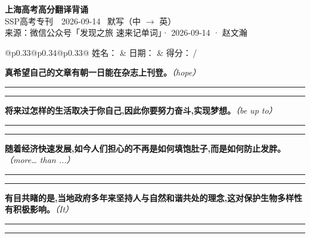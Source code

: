 \documentclass[11pt,a4paper]{article}
\newcommand{\num}[1]{\makebox[1.9em][r]{#1.}\hspace{0.3em}}
\newcommand{\wline}{\noindent\rule{\linewidth}{0.4pt}}
\newcommand{\prompt}[1]{\emph{\textcolor{tipblue}{\small（#1）}}}
\begin{document}
\pagestyle{plain}
\begin{center}
{\LARGE\bfseries 上海高考高分翻译背诵 }\\[0.25em]
{\large SSP高考专刊　2026-09-14 \quad\ 默写（中 $\to$ 英）}\\[0.35em]
{\footnotesize 来源：微信公众号「发现之旅 速来记单词」· 2026-09-14 · 赵文瀚}
\end{center}

\vspace{0.4em}
\noindent\begin{tabular}{@{}p{0.33\textwidth}@{}p{0.34\textwidth}@{}p{0.33\textwidth}@{}}
姓名：\underline{\hspace{2.0cm}} & 日期：\underline{\hspace{2.0cm}} & 得分：\underline{\hspace{1.4cm}}\,/ \\
\end{tabular}

\vspace{0.5em}

\vspace{0.8em}
\num{1}\textbf{真希望自己的文章有朝一日能在杂志上刊登。}\prompt{hope}

\vspace{0.3em}

\wline\vspace{0.3em}
\wline

\num{2}\textbf{将来过怎样的生活取决于你自己,因此你要努力奋斗,实现梦想。}\prompt{be up to}

\vspace{0.3em}

\wline\vspace{0.3em}
\wline

\num{3}\textbf{随着经济快速发展,如今人们担心的不再是如何填饱肚子,而是如何防止发胖。}\prompt{more… than ...}

\vspace{0.3em}

\wline\vspace{0.3em}
\wline

\num{4}\textbf{有目共睹的是,当地政府多年来坚持人与自然和谐共处的理念,这对保护生物多样性有积极影响。}\prompt{It}

\vspace{0.3em}

\wline\vspace{0.3em}
\wline
\end{document}
